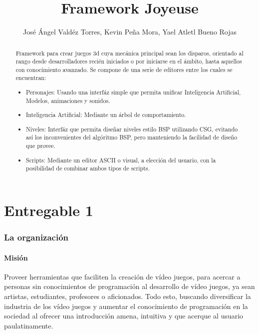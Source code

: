 \documentclass[]{article}
\title{Framework Joyeuse}
\author{Jos\'e \'Angel Vald\'ez Torres, Kevin Pe\~na Mora, Yael Atletl Bueno Rojas}
\begin{document}
\maketitle

\begin{abstract}
Framework para crear juegos 3d cuya mec\'anica principal sean los disparos, orientado al rango desde desarrolladores reci\'en iniciados o por iniciarse en el \'ambito, hasta aquellos con conocimiento avanzado. Se compone de una serie de editores entre los cuales se encuentran:
\begin{itemize}
	\item Personajes: Usando una interf\'az simple que permita unificar Inteligencia Artificial, Modelos, animaciones y sonidos. 
	\item Inteligencia Artificial: Mediante un \'arbol de comportamiento.
	\item Niveles: Interf\'az que permita dise\~nar niveles estilo BSP utilizando CSG, evitando as\'i los inconvenientes del alg\'oritmo BSP, pero manteniendo la facilidad de dise\~no que provee. 
	\item Scripts: Mediante un editor ASCII o visual, a elecci\'on del usuario, con la posibilidad de combinar ambos tipos de scripts. 
	
\end{itemize}

\end{abstract}
\newpage
\tableofcontents

\newpage
\part{Entregable 1}
\section{La organizaci\'on}


\subsection{Misi\'on}
Proveer herramientas que faciliten la creaci\'on de v\'ideo juegos, para acercar a personas sin conocimientos de programación al desarrollo de v\'ideo juegos, ya sean artistas, estudiantes, profesores o aficionados. Todo esto, buscando diversificar la industria de los v\'ideo juegos y aumentar el conocimiento de programaci\'on en la sociedad al ofrecer una introducci\'on amena, intuitiva y que acerque al usuario paulatinamente.
\end{document}

